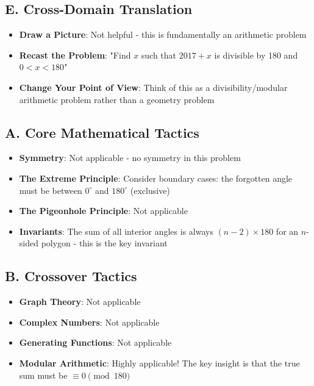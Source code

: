 \documentclass[]{article}
\begin{document}
\begin{strategicbox}
\subsection*{E. Cross-Domain Translation}
\begin{itemize}[leftmargin=*]
    \item \textbf{Draw a Picture}: Not helpful - this is fundamentally an arithmetic problem
    
    \item \textbf{Recast the Problem}: "Find $x$ such that $2017 + x$ is divisible by 180 and $0 < x < 180$"
    
    \item \textbf{Change Your Point of View}: Think of this as a divisibility/modular arithmetic problem rather than a geometry problem
\end{itemize}
\end{strategicbox}

\begin{tacticalbox}
\subsection*{A. Core Mathematical Tactics}
\begin{itemize}[leftmargin=*]
    \item \textbf{Symmetry}: Not applicable - no symmetry in this problem
    
    \item \textbf{The Extreme Principle}: Consider boundary cases: the forgotten angle must be between $0^\circ$ and $180^\circ$ (exclusive)
    
    \item \textbf{The Pigeonhole Principle}: Not applicable
    
    \item \textbf{Invariants}: The sum of all interior angles is always $(n-2) \times 180$ for an $n$-sided polygon - this is the key invariant
\end{itemize}

\subsection*{B. Crossover Tactics}
\begin{itemize}[leftmargin=*]
    \item \textbf{Graph Theory}: Not applicable
    
    \item \textbf{Complex Numbers}: Not applicable
    
    \item \textbf{Generating Functions}: Not applicable
    
    \item \textbf{Modular Arithmetic}: Highly applicable! The key insight is that the true sum must be $\equiv 0 \pmod{180}$
\end{itemize}
\end{tacticalbox}
\end{document}
